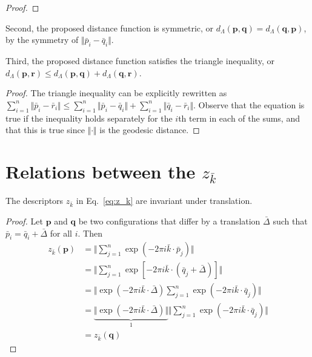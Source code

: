 \documentclass[default,iicol]{sn-jnl}%
\theoremstyle{thmstyleone}%
\theoremstyle{thmstyletwo}%
\theoremstyle{thmstylethree}%
\renewcommand{\vec}[1]{\bar{#1}}
\providecommand{\config}[1]{\mathbf{#1}}
\providecommand{\rmi}{i}
\begin{document}
\begin{appendices}
\begin{proof}
	\end{proof}
	
	Second, the proposed distance function is symmetric, or $d_\Lambda(\config{p},\config{q}) = d_\Lambda(\config{q},\config{p})$, by the symmetry of $\Vert \vec{p}_i - \vec{q}_i \Vert$.
	
	Third, the proposed distance function satisfies the triangle inequality, or $d_\Lambda(\config{p}, \config{r}) \leq d_\Lambda(\config{p}, \config{q}) + d_\Lambda(\config{q}, \config{r})$.
	\begin{proof}
		The triangle inequality can be explicitly rewritten as $\sum_{i = 1}^n \Vert \vec{p}_i - \vec{r}_i \Vert \leq \sum_{i = 1}^n \Vert \vec{p}_i - \vec{q}_i \Vert + \sum_{i = 1}^n \Vert \vec{q}_i - \vec{r}_i \Vert$. Observe that the equation is true if the inequality holds separately for the $i$th term in each of the sums, and that this is true since $\Vert \cdot \Vert$ is the geodesic distance.
	\end{proof}



	\section{Relations between the $z_{\vec{k}}$}
	\label{sec:descriptor_proofs}
	
	The descriptors $z_{\vec{k}}$ in Eq.\ \ref{eq:z_k} are invariant under translation.
	\begin{proof}
		Let $\config{p}$ and $\config{q}$ be two configurations that differ by a translation $\vec{\Delta}$ such that $\vec{p}_i = \vec{q}_i + \vec{\Delta}$ for all $i$. Then
		\begin{align*} 
			z_{\vec{k}}(\config{p}) &= \bigg\Vert \sum_{j=1}^{n} \exp{(-2\pi \rmi \vec{k} \cdot \vec{p}_j)}\bigg\Vert \nonumber \\ 
			&= \bigg\Vert \sum_{j=1}^{n} \exp{[-2\pi \rmi \vec{k} \cdot (\vec{q}_j + \vec{\Delta})]}\bigg\Vert \\
			&= \bigg\Vert \exp{(-2\pi \rmi \vec{k} \cdot \vec{\Delta})} \sum_{j=1}^{n} \exp{(-2\pi \rmi \vec{k} \cdot \vec{q}_j)}\bigg\Vert \nonumber \\
			&= \underbrace{\bigg\Vert \exp{(-2\pi \rmi \vec{k} \cdot \vec{\Delta})} \bigg\Vert}_{1}
			\bigg\Vert \sum_{j=1}^{n} \exp{(-2\pi \rmi \vec{k} \cdot \vec{q}_j)}\bigg\Vert \\
			&=  z_{\vec{k}}(\config{q})
		\end{align*}
	\end{proof}


\end{appendices}
\end{document}
